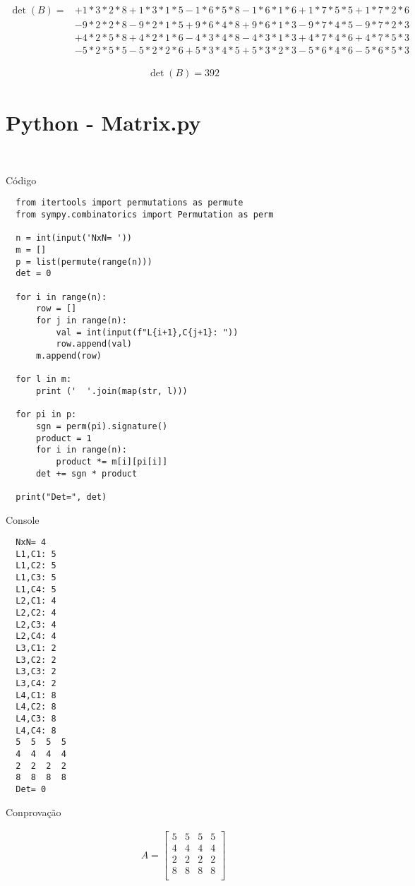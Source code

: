 \documentclass{article}
\begin{document}
\begin{align*}
  \det(B)=&+1*3*2*8+1*3*1*5-1*6*5*8-1*6*1*6+1*7*5*5+1*7*2*6 \\
  &-9*2*2*8-9*2*1*5+9*6*4*8+9*6*1*3-9*7*4*5-9*7*2*3 \\
  &+4*2*5*8+4*2*1*6-4*3*4*8-4*3*1*3+4*7*4*6+4*7*5*3 \\
  &-5*2*5*5-5*2*2*6+5*3*4*5+5*3*2*3-5*6*4*6-5*6*5*3
\end{align*}

\begin{align*}
  \det(B)=392
\end{align*}

\pagebreak

\section{Python - Matrix.py}\

{\Large Código}

\begin{verbatim}
  from itertools import permutations as permute
  from sympy.combinatorics import Permutation as perm
  
  n = int(input('NxN= '))
  m = []
  p = list(permute(range(n)))
  det = 0
  
  for i in range(n):
      row = []
      for j in range(n):
          val = int(input(f"L{i+1},C{j+1}: "))
          row.append(val)
      m.append(row)
  
  for l in m:
      print ('  '.join(map(str, l)))
  
  for pi in p:
      sgn = perm(pi).signature()
      product = 1
      for i in range(n):
          product *= m[i][pi[i]]
      det += sgn * product
  
  print("Det=", det)
\end{verbatim}

{\Large Console}

\begin{verbatim}
  NxN= 4
  L1,C1: 5
  L1,C2: 5
  L1,C3: 5
  L1,C4: 5
  L2,C1: 4
  L2,C2: 4
  L2,C3: 4
  L2,C4: 4
  L3,C1: 2
  L3,C2: 2
  L3,C3: 2
  L3,C4: 2
  L4,C1: 8
  L4,C2: 8
  L4,C3: 8
  L4,C4: 8
  5  5  5  5
  4  4  4  4
  2  2  2  2
  8  8  8  8
  Det= 0
\end{verbatim}

{\Large Conprovação}

\begin{align*}
  A = \begin{bmatrix}
    5 & 5 & 5 & 5 \\
    4 & 4 & 4 & 4 \\
    2 & 2 & 2 & 2 \\
    8 & 8 & 8 & 8 \\
    \end{bmatrix}
\end{align*}
\end{document}
